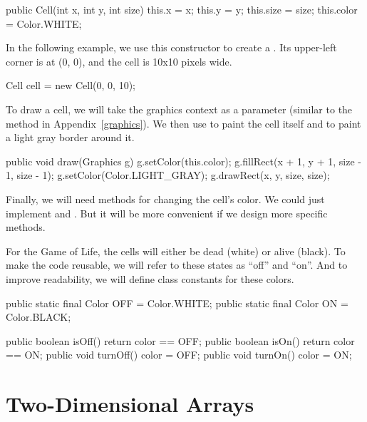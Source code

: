 \begin{code}
public Cell(int x, int y, int size) {
    this.x = x;
    this.y = y;
    this.size = size;
    this.color = Color.WHITE;
}
\end{code}

In the following example, we use this constructor to create a .
Its upper-left corner is at (0, 0), and the cell is 10x10 pixels wide.

\begin{code}
Cell cell = new Cell(0, 0, 10);
\end{code}

To draw a cell, we will take the graphics context as a parameter (similar to the  method in Appendix~\ref{graphics}).
We then use  to paint the cell itself and  to paint a light gray border around it.

\begin{code}
public void draw(Graphics g) {
    g.setColor(this.color);
    g.fillRect(x + 1, y + 1, size - 1, size - 1);
    g.setColor(Color.LIGHT_GRAY);
    g.drawRect(x, y, size, size);
}
\end{code}

Finally, we will need methods for changing the cell's color.
We could just implement  and .
But it will be more convenient if we design more specific methods.

For the Game of Life, the cells will either be dead (white) or alive (black).
To make the code reusable, we will refer to these states as ``off'' and ``on''.
And to improve readability, we will define class constants for these colors.

\begin{code}
public static final Color OFF = Color.WHITE;
public static final Color ON = Color.BLACK;

public boolean isOff() {
    return color == OFF;
}
public boolean isOn() {
    return color == ON;
}
public void turnOff() {
    color = OFF;
}
public void turnOn() {
    color = ON;
}
\end{code}


\section{Two-Dimensional Arrays}


